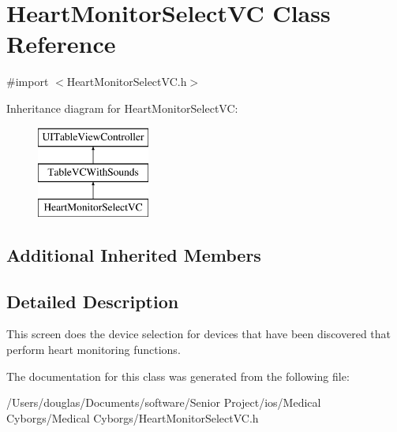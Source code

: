 \hypertarget{interface_heart_monitor_select_v_c}{\section{Heart\-Monitor\-Select\-V\-C Class Reference}
\label{interface_heart_monitor_select_v_c}
}


{\ttfamily \#import $<$Heart\-Monitor\-Select\-V\-C.\-h$>$}

Inheritance diagram for Heart\-Monitor\-Select\-V\-C\-:\begin{figure}[H]
\begin{center}
\leavevmode
\includegraphics[height=3.000000cm]{interface_heart_monitor_select_v_c}
\end{center}
\end{figure}
\subsection*{Additional Inherited Members}


\subsection{Detailed Description}
This screen does the device selection for devices that have been discovered that perform heart monitoring functions. 

The documentation for this class was generated from the following file\-:\begin{DoxyCompactItemize}
\item 
/\-Users/douglas/\-Documents/software/\-Senior Project/ios/\-Medical Cyborgs/\-Medical Cyborgs/Heart\-Monitor\-Select\-V\-C.\-h\end{DoxyCompactItemize}
